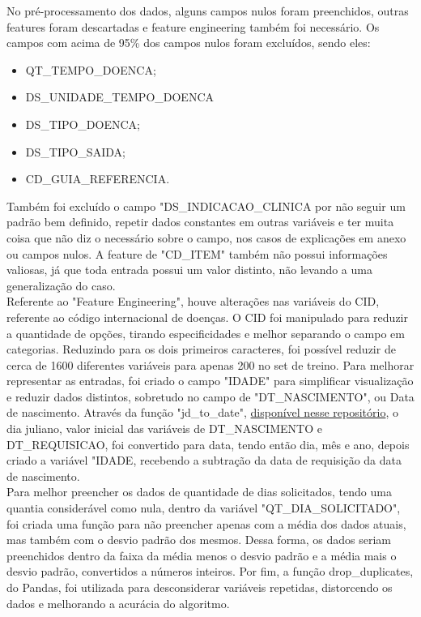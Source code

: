 \documentclass{article}
\begin{document}
No pré-processamento dos dados, alguns campos nulos foram preenchidos, outras features foram descartadas e feature engineering também foi necessário. Os campos com acima de 95\% dos campos nulos foram excluídos, sendo eles: \begin{itemize}
    \item QT\_TEMPO\_DOENCA;
    \item DS\_UNIDADE\_TEMPO\_DOENCA
    \item DS\_TIPO\_DOENCA;
    \item DS\_TIPO\_SAIDA;
    \item CD\_GUIA\_REFERENCIA.
\end{itemize}
Também foi excluído o campo "DS\_INDICACAO\_CLINICA por não seguir um padrão bem definido, repetir dados constantes em outras variáveis e ter muita coisa que não diz o necessário sobre o campo, nos casos de explicações em anexo ou campos nulos. A feature de "CD\_ITEM" também não possui informações valiosas, já que toda entrada possui um valor distinto, não levando a uma generalização do caso. 
\\
Referente ao "Feature Engineering", houve alterações nas variáveis do CID, referente ao código internacional de doenças. O CID foi manipulado para reduzir a quantidade de opções, tirando especificidades e melhor separando o campo em categorias.  Reduzindo para os dois primeiros caracteres, foi possível reduzir de cerca de 1600 diferentes variáveis para apenas 200 no set de treino. Para melhorar representar as entradas, foi criado o campo "IDADE" para simplificar visualização e reduzir dados distintos, sobretudo no campo de "DT\_NASCIMENTO", ou Data de nascimento. Através da função "jd\_to\_date", 
\href{https://github.com/meshula/exifotio/blob/master/jdutil.py}{disponível nesse repositório}, 
o dia juliano, valor inicial das variáveis de DT\_NASCIMENTO e DT\_REQUISICAO, foi convertido para data, tendo então dia, mês e ano, depois criado a variável "IDADE, recebendo a subtração da data de requisição da data de nascimento. 
\\
Para melhor preencher os dados de quantidade de dias solicitados, tendo uma quantia considerável como nula, dentro da variável "QT\_DIA\_SOLICITADO", foi criada uma função para não preencher apenas com a média dos dados atuais, mas também com o desvio padrão dos mesmos. Dessa forma, os dados seriam preenchidos dentro da faixa da média menos o desvio padrão e a média mais o desvio padrão, convertidos a números inteiros. Por fim, a função drop\_duplicates, do Pandas, foi utilizada para desconsiderar variáveis repetidas, distorcendo os dados e melhorando a acurácia do algoritmo. 
\end{document}

